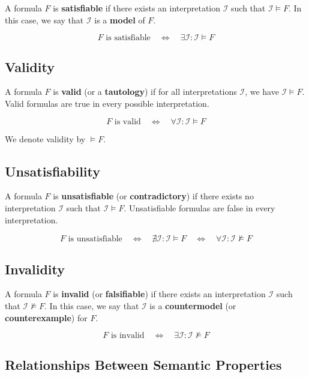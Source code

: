 \documentclass[11pt,a4paper]{article}
\theoremstyle{definition}
\theoremstyle{plain}
\theoremstyle{remark}
\begin{document}
A formula $F$ is \textbf{satisfiable} if there exists an interpretation $\mathcal{I}$ such that $\mathcal{I} \models F$. In this case, we say that $\mathcal{I}$ is a \textbf{model} of $F$.

\[
F \text{ is satisfiable} \quad \Leftrightarrow \quad \exists \mathcal{I} : \mathcal{I} \models F
\]

\subsection{Validity}

A formula $F$ is \textbf{valid} (or a \textbf{tautology}) if for all interpretations $\mathcal{I}$, we have $\mathcal{I} \models F$. Valid formulas are true in every possible interpretation.

\[
F \text{ is valid} \quad \Leftrightarrow \quad \forall \mathcal{I} : \mathcal{I} \models F
\]

We denote validity by $\models F$.

\subsection{Unsatisfiability}

A formula $F$ is \textbf{unsatisfiable} (or \textbf{contradictory}) if there exists no interpretation $\mathcal{I}$ such that $\mathcal{I} \models F$. Unsatisfiable formulas are false in every interpretation.

\[
F \text{ is unsatisfiable} \quad \Leftrightarrow \quad \nexists \mathcal{I} : \mathcal{I} \models F \quad \Leftrightarrow \quad \forall \mathcal{I} : \mathcal{I} \not\models F
\]

\subsection{Invalidity}

A formula $F$ is \textbf{invalid} (or \textbf{falsifiable}) if there exists an interpretation $\mathcal{I}$ such that $\mathcal{I} \not\models F$. In this case, we say that $\mathcal{I}$ is a \textbf{countermodel} (or \textbf{counterexample}) for $F$.

\[
F \text{ is invalid} \quad \Leftrightarrow \quad \exists \mathcal{I} : \mathcal{I} \not\models F
\]

\subsection{Relationships Between Semantic Properties}
\end{document}
